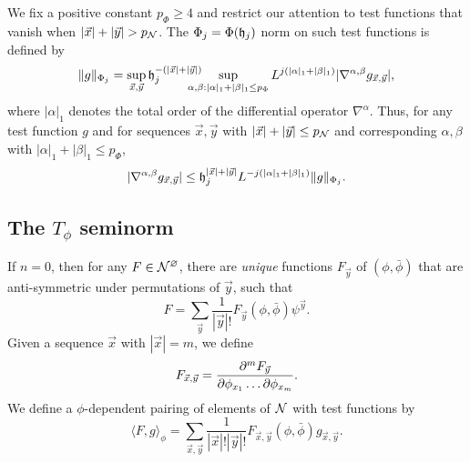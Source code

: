 We fix a positive constant $p_\Phi\ge 4$ and restrict our attention to test functions
that vanish when $|\vec x|  +|\vec y| > p_{\mathcal{N}}$.
The $\Phi_j = \Phi(\mathfrak{h}_j)$ norm on such test functions is defined by
\begin{equation}
\|g\|_{\Phi_j}
	=
\sup_{\vec x, \vec y} \h_j^{-(|\vec x| +|\vec y|)}
	\shift\shift
\sup_{\alpha,\beta: |\alpha|_1+|\beta|_1 \le p_\Phi}
L^{j (|\alpha|_1 + |\beta|_1)}
|\nabla^{\alpha,\beta} g_{\vec x, \vec y}|,
\end{equation}
where $|\alpha|_1$ denotes the total order of the differential operator $\nabla^\alpha$.
Thus, for any test function $g$ and for sequences
$\vec x, \vec y$ with $|\vec x| +|\vec y| \leq p_{\mathcal{N}}$ and
corresponding $\alpha, \beta$ with $|\alpha|_1 + |\beta|_1 \leq p_\Phi$,
\begin{equation}
\label{e:testfcnbd}
|\nabla^{\alpha,\beta} g_{\vec x,\vec y}|
	\leq
\mathfrak{h}_j^{|\vec x| + |\vec y|} L^{-j (|\alpha|_1 + |\beta|_1)} \|g\|_{\Phi_j}.
\end{equation}


\subsection{The \texorpdfstring{$T_\phi$}{Tphi} seminorm}
\label{sec:Tphi}

If $n = 0$, then for any $F \in \mathcal{N}^\varnothing$, there are
\emph{unique} functions $F_{\vec y}$ of $(\phi, \bar\phi)$
that are anti-symmetric under permutations of $\vec y$, such that
\begin{equation}
F = \sum_{\vec y} \frac{1}{|\vec y|!} F_{\vec y}(\phi, \bar\phi) \psi^{\vec y}.
\end{equation}
Given a sequence $\vec{x}$ with $|\vec{x}| = m$, we define
\begin{equation}
F_{\vec x, \vec y} = \frac{\partial ^m F_{\vec y}}{\partial \phi_{x_1} \ldots \partial\phi_{x_m}}.
\end{equation}
We define a $\phi$-dependent pairing of elements of $\mathcal{N}$ with test functions by
\begin{equation}
\label{e:pairing}
\langle F, g \rangle_\phi
  =
\sum_{\vec x, \vec y}
\frac{1}{|\vec x|! |\vec y|!}
F_{\vec x,\vec y}(\phi, \bar\phi)
g_{\vec x,\vec y}.
\end{equation}


